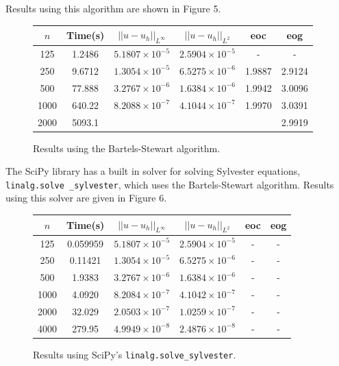 \documentclass{article}
\numberwithin{equation}{section}
\begin{document}
Results using this algorithm are shown in Figure 5.

\begin{figure}[H]
\centering
\begin{tabular}{|c|c|c|c|c|c|}
\hline
$n$ & Time(s) & $|| u - u_h ||_{L^{\infty}}$ &$|| u - u_h ||_{L^{2}}$ & eoc & eog \\
\hline
125 & 1.2486 & $5.1807 \times 10^{-5}$ & $2.5904 \times 10^{-5}$ & - & - \\
250 & 9.6712 & $1.3054 \times 10^{-5}$ & $6.5275 \times 10^{-6}$ & 1.9887 & 2.9124 \\
500 & 77.888 & $3.2767 \times 10^{-6}$ & $1.6384 \times 10^{-6}$ & 1.9942 & 3.0096 \\ 
1000 & 640.22 & $8.2088 \times 10^{-7}$ & $4.1044 \times 10^{-7}$ & 1.9970 & 3.0391 \\
2000 & 5093.1 & $ $ & $ $ & & 2.9919 \\
\hline
\end{tabular}
\caption{Results using the Bartels-Stewart algorithm.}
\end{figure}

The SciPy library has a built in solver for solving Sylvester equations, \texttt{linalg.solve \_sylvester}, which uses the Bartels-Stewart algorithm. Results using this solver are given in Figure 6.

\begin{figure}[H]
\centering
\begin{tabular}{|c|c|c|c|c|c|}
\hline
$n$ & Time(s) & $|| u - u_h ||_{L^{\infty}}$ &$|| u - u_h ||_{L^{2}}$ & eoc & eog \\
\hline
125 & 0.059959 & $5.1807 \times 10^{-5}$ & $2.5904 \times 10^{-5}$ & - & - \\
250 & 0.11421 & $1.3054 \times 10^{-5}$ & $6.5275 \times 10^{-6}$ & - & - \\
500 & 1.9383 & $3.2767 \times 10^{-6}$ & $1.6384 \times 10^{-6}$ & - & -  \\
1000 & 4.0920 & $8.2084 \times 10^{-7}$ & $4.1042 \times 10^{-7}$ & - & - \\
2000 & 32.029 & $2.0503 \times 10^{-7}$ & $1.0259 \times 10^{-7}$ & - & -  \\
4000 & 279.95 & $4.9949 \times 10^{-8}$ & $2.4876 \times 10^{-8}$ & - & -  \\
\hline
\end{tabular}
\caption{Results using SciPy's \texttt{linalg.solve\_sylvester}.}
\end{figure}
\end{document}

